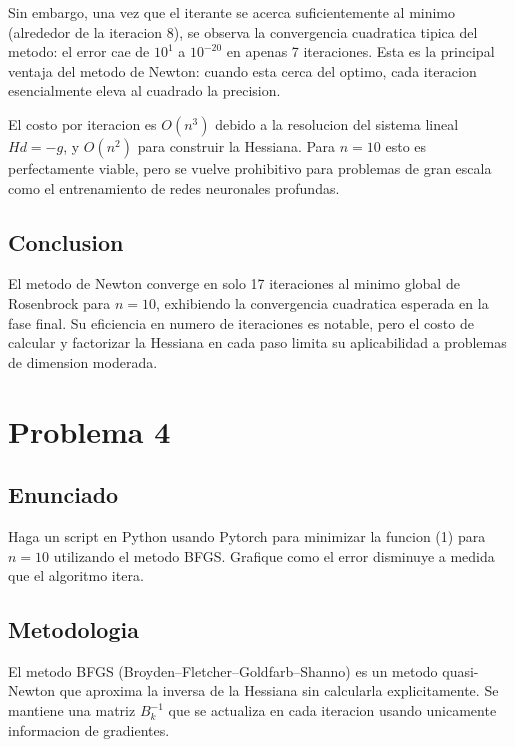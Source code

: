 \documentclass{article}
\begin{document}
Sin embargo, una vez que el iterante se acerca suficientemente al minimo (alrededor de la iteracion 8), se observa la convergencia cuadratica tipica del metodo: el error cae de $10^{1}$ a $10^{-20}$ en apenas 7 iteraciones. Esta es la principal ventaja del metodo de Newton: cuando esta cerca del optimo, cada iteracion esencialmente eleva al cuadrado la precision.

El costo por iteracion es $O(n^3)$ debido a la resolucion del sistema lineal $H d = -g$, y $O(n^2)$ para construir la Hessiana. Para $n = 10$ esto es perfectamente viable, pero se vuelve prohibitivo para problemas de gran escala como el entrenamiento de redes neuronales profundas.

\subsection{Conclusion}

El metodo de Newton converge en solo 17 iteraciones al minimo global de Rosenbrock para $n = 10$, exhibiendo la convergencia cuadratica esperada en la fase final. Su eficiencia en numero de iteraciones es notable, pero el costo de calcular y factorizar la Hessiana en cada paso limita su aplicabilidad a problemas de dimension moderada.


\section{Problema 4}

\subsection{Enunciado}

Haga un script en Python usando Pytorch para minimizar la funcion (1) para $n = 10$ utilizando el metodo BFGS. Grafique como el error disminuye a medida que el algoritmo itera.

\subsection{Metodologia}

El metodo BFGS (Broyden--Fletcher--Goldfarb--Shanno) es un metodo quasi-Newton que aproxima la inversa de la Hessiana sin calcularla explicitamente. Se mantiene una matriz $B_k^{-1}$ que se actualiza en cada iteracion usando unicamente informacion de gradientes.
\end{document}
